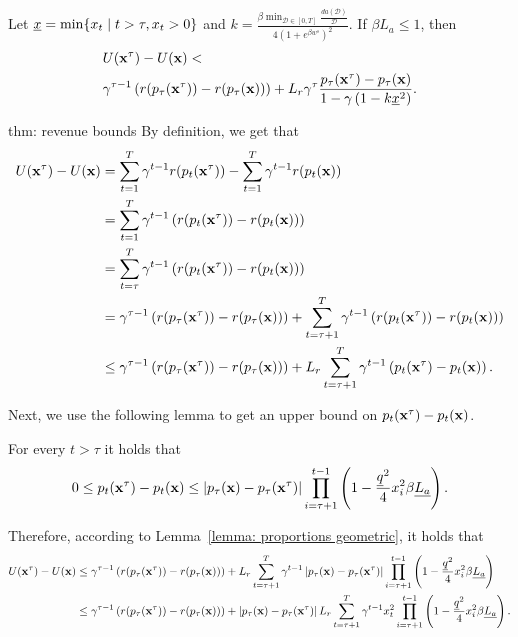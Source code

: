 \begin{theorem} \label{thm: revenue bounds}
Let $\underline{x} = \min \{ x_t \mid t > \tau, x_t > 0 \}$ and $k = \frac{\beta \min_{\mathcal{D} \in [0, T]} \frac{da(\mathcal{D})}{\mathcal{D}}}{4 \left(1+e^{\beta w^s} \right)^2} $. If $\beta L_a \leq 1$, then
\begin{align*}
&U({\bf{x}}^\tau) - U({\bf{x}}) < \\
&\gamma^{\tau - 1} \left( r(p_\tau({\bf{x}}^\tau)) - r(p_\tau({\bf{x}})) \right) + L_r \gamma^{\tau} \frac{p_\tau({\bf{x}}^\tau)-p_\tau({\bf{x}})}{1-\gamma \left( 1 - k \underline{x}^2 \right)}.
\end{align*}
\end{theorem}


\begin{proofof}{thm: revenue bounds}
By definition, we get that
\begin{align*}
U({\bf{x}}^\tau) - U({\bf{x}}) &= \sum_{t = 1}^T \gamma^{t-1} r(p_t({\bf{x}}^\tau)) - \sum_{t = 1}^T \gamma^{t-1} r(p_t({\bf{x}})) \\
&= \sum_{t = 1}^T \gamma^{t-1} \left(r(p_t({\bf{x}}^\tau)) - r(p_t({\bf{x}})) \right) \\
&= \sum_{t = \tau}^T \gamma^{t-1} \left( r(p_t({\bf{x}}^\tau)) - r(p_t({\bf{x}})) \right) \\
&= \gamma^{\tau - 1} \left( r(p_\tau({\bf{x}}^\tau)) - r(p_\tau({\bf{x}})) \right) + \sum_{t = \tau + 1}^T \gamma^{t-1} \left( r(p_t({\bf{x}}^\tau)) - r(p_t({\bf{x}})) \right) \\
&\leq \gamma^{\tau - 1} \left( r(p_\tau({\bf{x}}^\tau)) - r(p_\tau({\bf{x}})) \right) + L_r \sum_{t = \tau + 1}^T \gamma^{t-1} \left( p_t({\bf{x}}^\tau) - p_t({\bf{x}}) \right).
\end{align*}

Next, we use the following lemma to get an upper bound on $p_t({\bf{x}}^\tau) - p_t({\bf{x}})$.

\begin{lemma} \label{lemma: proportions geometric}
For every $t > \tau$ it holds that
\begin{align*}
0 \leq p_t({\bf{x}}^\tau) - p_t({\bf{x}}) \leq \left| p_\tau({\bf{x}}) - p_\tau({\bf{x}}^\tau) \right| \prod_{i = \tau + 1}^{t-1} \left( 1 - \frac{\underline{q} ^2}{4} x_i^2 \beta \underline{L_a} \right).
\end{align*}
\end{lemma}

Therefore, according to Lemma~\ref{lemma: proportions geometric}, it holds that
\begin{align*}
U({\bf{x}}^\tau) - U({\bf{x}}) &\leq \gamma^{\tau - 1} \left( r(p_\tau({\bf{x}}^\tau)) - r(p_\tau({\bf{x}})) \right) + L_r \sum_{t = \tau + 1}^T \gamma^{t-1} \left| p_\tau({\bf{x}}) - p_\tau({\bf{x}}^\tau) \right| \prod_{i = \tau + 1}^{t-1} \left( 1 - \frac{\underline{q} ^2}{4} x_i^2 \beta \underline{L_a} \right) \\
&\leq \gamma^{\tau - 1} \left( r(p_\tau({\bf{x}}^\tau)) - r(p_\tau({\bf{x}})) \right) +  \left| p_\tau({\bf{x}}) - p_\tau({\bf{x}}^\tau) \right| L_r \sum_{t = \tau + 1}^T \gamma^{t-1} x_t^2 \prod_{i = \tau + 1}^{t-1} \left( 1 - \frac{\underline{q} ^2}{4} x_i^2 \beta \underline{L_a} \right).
\end{align*}


\end{proofof}
